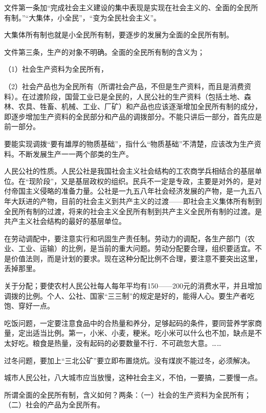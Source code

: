 文件第一条加“完成社会主义建设的集中表现是实现在社会主义的、全面的全民所有制。”“大集体，小全民”，“变为全民社会主义”。

大集体所有制也就是小全民所有制，要逐步的发展为全面的全民所有制。

文件第三条，生产的对象不明确。全面的全民所有制的含义为；

（1）社会生产资料为全民所有，

（2）社会产品也为全民所有（所谓社会产品，不但是生产资料，而且是消费资料）。在过渡阶段，国营工业已是全民的，人民公社的生产资料（包括土地、森林、农具、牲畜、机械、工业、厂矿）和产品也应该逐渐增加全民所有制的成分，即逐步增加生产资料的全民部分和产品的调拨部分。不能只讲后一部分，首先应是前一部分。

要能实现调拨“要有雄厚的物质基础”，指什么“物质基础”不清楚，应该改为生产资料。不断发展生产一一两个部类的生产。

人民公社的性质。人民公社是我国社会主义社会结构的工农商学兵相结合的基层单位。在“现阶段”，又是基层政权的组织。民兵不一定是专政，主要是对外的，是对付帝国主义侵略的准备力量。公社是一九五八年社会经济发展的产物，是一九五八年大跃进的产物，目前的社会主义到共产主义的过渡——即社会主义集体所有制到全民所有制的过渡，将来的社会主义全民所有制到共产主义全民所有制的过渡。是共产主义社会结构的最好的基层单位。

在劳动调配中，要注意实行和巩固生产责任制。劳动力的调配，各生产部门（农业、工业、运输）的比例，是当前的重大问题。劳动分配要合理，组织要适宜。不是价值法则，而是计划的要求。现在这种分配比例不合理，要注意不要突出这里，丢掉那里。

关于分配；要使农村人民公社每人每年平均有150——200元的消费水平，并且增加调拨的比例。个人、公社、国家“三三制”的规定是好的，能得人心。要生产者吃饱、穿好一点。

吃饭问题，一定要注意食品中的合热量和养分，足够起码的条件，要同营养学家商量，定出适当比例。第一，小米、小麦，粳米。吃小米可以什么也不加，缺点是不太好吃。粮食是热量，没有起码的必要数量不行．不可疏忽大意。……

过冬问题，要加上“三北公矿”要立即布置烧炕。没有煤炭不能过冬，必须解决。

城市人民公社，八大城市应当放慢，这种社会主义，不怕，一要搞，二要慢一点。

所谓全面的全民所有制，含义如何？两条：（一）社会的生产资料为全民所有；（二）社会的产品为全民所有。


